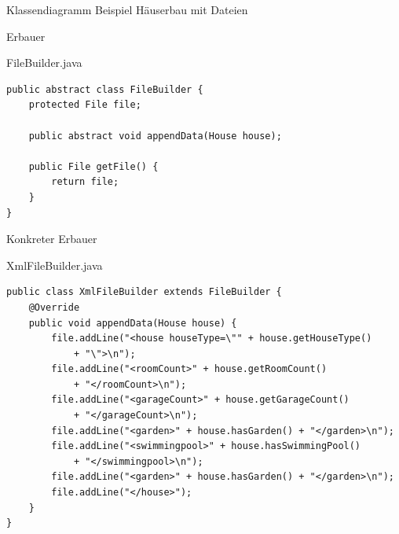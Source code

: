 \begin{frame}{Klassendiagramm Beispiel Häuserbau mit Dateien}
\end{frame}

\begin{frame}[fragile]{Erbauer}
	\begin{exampleblock}{FileBuilder.java}
 		\begin{lstlisting}
public abstract class FileBuilder {
	protected File file;
	
	public abstract void appendData(House house);

	public File getFile() {
		return file;
	}
}
 		\end{lstlisting}
 	\end{exampleblock}
\end{frame}

\begin{frame}[fragile]{Konkreter Erbauer}
	\begin{exampleblock}{XmlFileBuilder.java}
        \begin{lstlisting}
public class XmlFileBuilder extends FileBuilder {
	@Override
	public void appendData(House house) {
		file.addLine("<house houseType=\"" + house.getHouseType() 
            + "\">\n");
		file.addLine("<roomCount>" + house.getRoomCount() 
            + "</roomCount>\n");
		file.addLine("<garageCount>" + house.getGarageCount() 
            + "</garageCount>\n");
		file.addLine("<garden>" + house.hasGarden() + "</garden>\n");
		file.addLine("<swimmingpool>" + house.hasSwimmingPool() 
            + "</swimmingpool>\n");
		file.addLine("<garden>" + house.hasGarden() + "</garden>\n");
		file.addLine("</house>");
	}
}            
        \end{lstlisting}
 	\end{exampleblock}
\end{frame}

